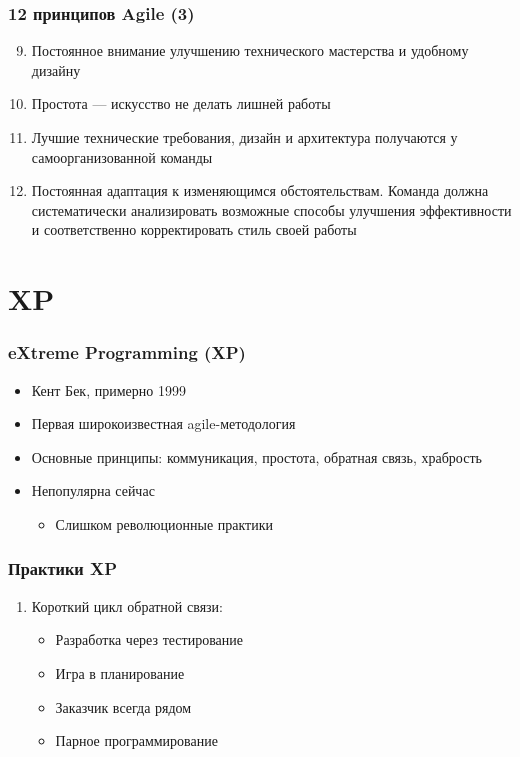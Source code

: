 \documentclass{../../slides-style}
\begin{document}
    \begin{frame}
        \frametitle{12 принципов Agile (3)}
        \begin{enumerate}
            \setcounter{enumi}{8}
            \item Постоянное внимание улучшению технического мастерства и удобному дизайну
            \item Простота — искусство не делать лишней работы
            \item Лучшие технические требования, дизайн и архитектура получаются у самоорганизованной команды
            \item Постоянная адаптация к изменяющимся обстоятельствам. Команда должна систематически анализировать возможные способы улучшения эффективности и соответственно корректировать стиль своей работы
        \end{enumerate}
    \end{frame}

    \section{XP}

    \begin{frame}
        \frametitle{eXtreme Programming (XP)}
        \begin{itemize}
            \item Кент Бек, примерно 1999
            \item Первая широкоизвестная agile-методология
            \item Основные принципы: коммуникация, простота, обратная связь, храбрость
            \item Непопулярна сейчас
            \begin{itemize}
                \item Слишком революционные практики
            \end{itemize}
        \end{itemize}
    \end{frame}

    \begin{frame}
        \frametitle{Практики XP}
        \begin{enumerate}
            \item Короткий цикл обратной связи:
            \begin{itemize}
                \item Разработка через тестирование 
                \item Игра в планирование
                \item Заказчик всегда рядом
                \item Парное программирование
            \end{itemize}
        \end{enumerate}
    \end{frame}
\end{document}
